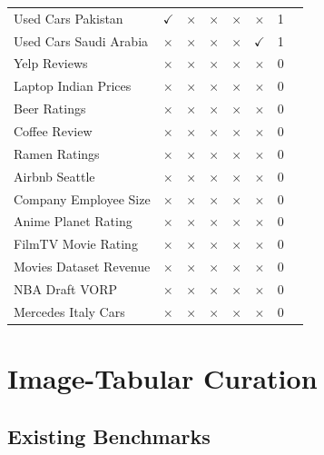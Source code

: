 \begin{longtable}{llcccccr}
Used Cars Pakistan  & $\checkmark$ & $\times$     & $\times$     & $\times$     & $\times$     & 1 \\
Used Cars Saudi Arabia   & $\times$     & $\times$     & $\times$     & $\times$     & $\checkmark$ & 1 \\
Yelp Reviews    & $\times$     & $\times$     & $\times$     & $\times$     & $\times$     & 0 \\
Laptop Indian Prices   & $\times$     & $\times$     & $\times$     & $\times$     & $\times$     & 0 \\
Beer Ratings   & $\times$     & $\times$     & $\times$     & $\times$     & $\times$     & 0 \\
Coffee Review   & $\times$     & $\times$     & $\times$     & $\times$     & $\times$     & 0 \\
Ramen Ratings   & $\times$     & $\times$     & $\times$     & $\times$     & $\times$     & 0 \\
Airbnb Seattle   & $\times$     & $\times$     & $\times$     & $\times$     & $\times$     & 0 \\
Company Employee Size    & $\times$     & $\times$     & $\times$     & $\times$     & $\times$     & 0 \\
Anime Planet Rating   & $\times$     & $\times$     & $\times$     & $\times$     & $\times$     & 0 \\
FilmTV Movie Rating   & $\times$     & $\times$     & $\times$     & $\times$     & $\times$     & 0 \\
Movies Dataset Revenue    & $\times$     & $\times$     & $\times$     & $\times$     & $\times$     & 0 \\
NBA Draft VORP   & $\times$     & $\times$     & $\times$     & $\times$     & $\times$     & 0 \\
Mercedes Italy Cars   & $\times$     & $\times$     & $\times$     & $\times$     & $\times$     & 0 \\
\end{longtable}

\section{Image-Tabular Curation}
\label{app:image_curation}

\subsection{Existing Benchmarks}

